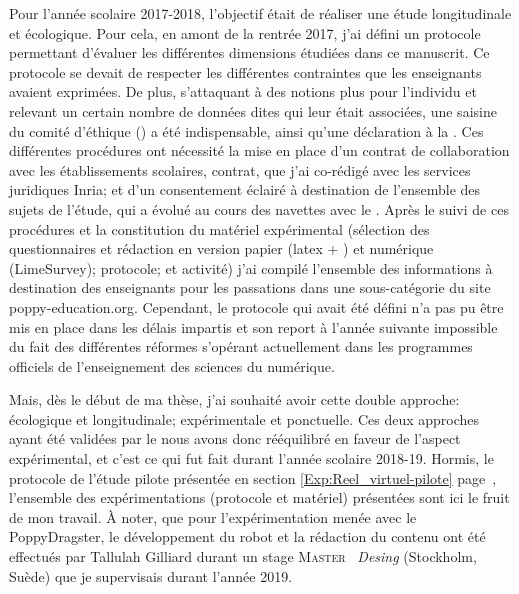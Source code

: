         Pour l'année scolaire 2017-2018, l'objectif était de réaliser une étude longitudinale et écologique. Pour cela, en amont de la rentrée 2017, j'ai défini un protocole permettant d'évaluer les différentes dimensions étudiées dans ce manuscrit. Ce protocole se devait de respecter les différentes contraintes que les enseignants avaient exprimées.
        De plus, s'attaquant à des notions plus  pour l'individu et relevant un certain nombre de données dites  qui leur était associées, une saisine du comité d'éthique (\cf {}) a été indispensable, ainsi qu'une déclaration à la .
        Ces différentes procédures ont nécessité la mise en place \Li d'un contrat de collaboration avec les établissements scolaires, contrat, que j'ai co-rédigé avec les services juridiques Inria; et \ii  d'un consentement éclairé à destination de l'ensemble des sujets de l'étude, qui a évolué au cours des navettes avec le .
        Après le suivi de ces procédures et la constitution du matériel expérimental (\eg sélection des questionnaires et rédaction en version papier (latex + ) et numérique (LimeSurvey); protocole; et activité) j'ai compilé l'ensemble des informations à destination des enseignants pour les passations dans une sous-catégorie du site poppy-education.org.
        Cependant, le protocole qui avait été défini n'a pas pu être mis en place dans les délais impartis et son report à l'année suivante impossible du fait des différentes réformes s'opérant actuellement dans les programmes officiels de l'enseignement des sciences du numérique.\par%
        Mais, dès le début de ma thèse, j'ai souhaité avoir cette double approche: \Li écologique et longitudinale; \ii expérimentale et ponctuelle.
        Ces deux approches ayant été validées par le  nous avons donc rééquilibré en faveur de l'aspect expérimental, et c'est ce qui fut fait durant l'année scolaire 2018-19. Hormis, le protocole de l'étude pilote présentée en section \ref{Exp:Reel_virtuel-pilote} page~\pageref{Exp:Reel_virtuel-pilote}, l'ensemble des expérimentations (protocole et matériel) présentées sont ici le fruit de mon travail. À noter, que pour l'expérimentation menée avec le PoppyDragster, le développement du robot et la rédaction du contenu ont été effectués par Tallulah Gilliard durant un stage \textsc{Master} ~\textit{Desing} (Stockholm, Suède) que je supervisais durant l'année 2019.
